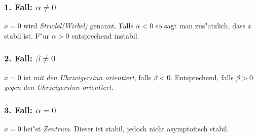 \documentclass[a4paper, 13pt]{scrreprt}
\theoremstyle{definition} \newtheorem{definition}{Definition}[section]
\begin{document}
\subsubsection{1. Fall: \(\alpha \not = 0\)}
$x=0$ wird \emph{Strudel(Wirbel)} genannt. Falls $\alpha < 0$ so sagt man zus"atzlich, dass $x$ stabil ist. F"ur $\alpha > 0$ entsprechend instabil.
\subsubsection{2. Fall: \(\beta \not = 0\)}
$x=0$ ist \emph{mit den Uhrzeigersinn orientiert}, falls $\beta < 0$. Entsprechend, falls $\beta > 0$ \emph{ gegen den Uhrzeigersinn orientiert}.
\subsubsection{3. Fall: \(\alpha = 0\)}
$x=0$ hei"st \emph{Zentrum}. Dieser ist stabil, jedoch nicht asymptotisch stabil.
\end{document}
